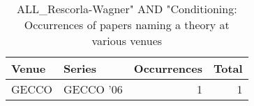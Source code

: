 \begin{table*}[t]
\begin{tabular}{llrr}
Venue & Series & Occurrences & Total\\\hline
\multirow{1}{*}{GECCO } & GECCO '06 & 1 & \multirow{1}{*}{1}\\
\end{tabular}
\caption{ALL\_Rescorla-Wagner" AND "Conditioning: Occurrences of papers naming a theory at various venues}
\end{table*}